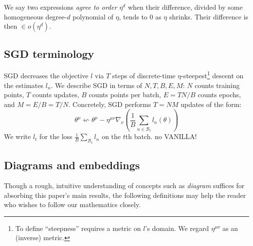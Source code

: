 \documentclass{article}
\theoremstyle{plain}
\theoremstyle{definition}
\newcommand{\wrap}[1]{\left(#1\right)}
\newcommand{\Bb}{\mathcal{B}}
\begin{document}
        We say two expressions \emph{agree to order $\eta^d$} when their
        difference, divided by some homogeneous degree-$d$ polynomial of
        $\eta$, tends to $0$ as $\eta$ shrinks.  Their difference is then $\in
        o(\eta^d)$.
        

    \subsection{SGD terminology}
        SGD decreases the objective $l$ via $T$ steps of discrete-time
        $\eta$-steepest\footnote{
            To define ``steepness'' requires a metric on $l$'s domain.  We
            regard $\eta^{\mu\nu}$ as an (inverse) metric.
        } descent on the estimates $l_n$.
        We describe SGD in terms of $N,T,B,E,M$:
            $N$ counts training points,
            $T$ counts updates,
            $B$ counts points per batch,
            $E=TN/B$ counts epochs, 
            and $M=E/B=T/N$.
        Concretely, SGD performs $T=NM$ updates of the form:
        $$
            \theta^\mu
            \leftsquigarrow
            \theta^\mu -
            \eta^{\mu\nu} \nabla_\nu
                \wrap{\frac{1}{B} \sum_{n\in \Bb_t} l_n(\theta)}
        $$
        We write $l_t$ for the loss $\frac{1}{B}\sum_{\Bb_t} l_n$ on the $t$th
        batch. 
        {\color{red} no VANILLA!}  


    \subsection{Diagrams and embeddings}

        Though a rough, intuitive understanding of concepts such as
        \emph{diagram} suffices for absorbing this paper's main results, the
        following definitions may help the reader who wishes to follow our
        mathematics closely.
\end{document}
